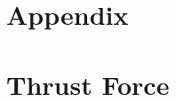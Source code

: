 \documentclass[../main.tex]{subfiles}
\begin{document}
\section*{Appendix}
\appendix
\section{Thrust Force}
\end{document}
